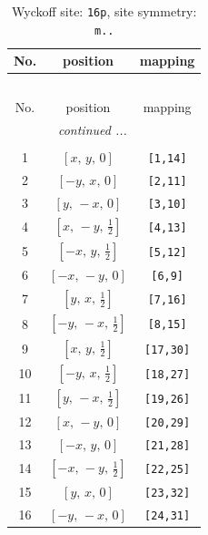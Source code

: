 \documentclass[fleqn,8pt]{jsarticle}
\begin{document}
\begin{longtable}{ccc}
\caption{Wyckoff site: {\tt 16p}, site symmetry: {\tt m..}}
 \\
 \hline \hline
No. & position & mapping \\ \hline \endfirsthead

\multicolumn{2}{l}{\tablename\ \thetable{}} \\
 \hline \hline
No. & position & mapping \\ \hline \endhead

 \hline \hline
\multicolumn{2}{r}{\footnotesize\it continued ...} \\ \endfoot

 \hline \hline
\multicolumn{2}{r}{} \\ \endlastfoot

1 & $\left[ x,\, y,\, 0 \right]$ & {\tt [1,14]} \\ \hline
2 & $\left[ - y,\, x,\, 0 \right]$ & {\tt [2,11]} \\ \hline
3 & $\left[ y,\, - x,\, 0 \right]$ & {\tt [3,10]} \\ \hline
4 & $\left[ x,\, - y,\, \frac{1}{2} \right]$ & {\tt [4,13]} \\ \hline
5 & $\left[ - x,\, y,\, \frac{1}{2} \right]$ & {\tt [5,12]} \\ \hline
6 & $\left[ - x,\, - y,\, 0 \right]$ & {\tt [6,9]} \\ \hline
7 & $\left[ y,\, x,\, \frac{1}{2} \right]$ & {\tt [7,16]} \\ \hline
8 & $\left[ - y,\, - x,\, \frac{1}{2} \right]$ & {\tt [8,15]} \\ \hline
9 & $\left[ x,\, y,\, \frac{1}{2} \right]$ & {\tt [17,30]} \\ \hline
10 & $\left[ - y,\, x,\, \frac{1}{2} \right]$ & {\tt [18,27]} \\ \hline
11 & $\left[ y,\, - x,\, \frac{1}{2} \right]$ & {\tt [19,26]} \\ \hline
12 & $\left[ x,\, - y,\, 0 \right]$ & {\tt [20,29]} \\ \hline
13 & $\left[ - x,\, y,\, 0 \right]$ & {\tt [21,28]} \\ \hline
14 & $\left[ - x,\, - y,\, \frac{1}{2} \right]$ & {\tt [22,25]} \\ \hline
15 & $\left[ y,\, x,\, 0 \right]$ & {\tt [23,32]} \\ \hline
16 & $\left[ - y,\, - x,\, 0 \right]$ & {\tt [24,31]} \\
\end{longtable}
\renewcommand{\arraystretch}{1.2}
\end{document}
